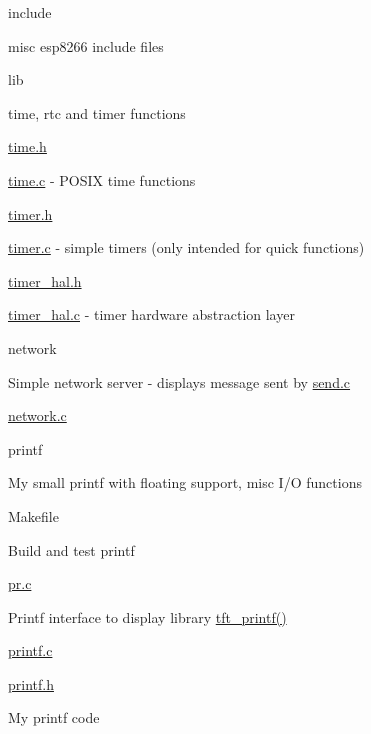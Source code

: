 \begin{DoxyItemize}
\begin{DoxyItemize}
\end{DoxyItemize}
\item include
\begin{DoxyItemize}
\item misc esp8266 include files
\end{DoxyItemize}
\item lib
\begin{DoxyItemize}
\item time, rtc and timer functions
\begin{DoxyItemize}
\item \hyperlink{time_8h}{time.\-h}
\item \hyperlink{time_8c}{time.\-c} -\/ P\-O\-S\-I\-X time functions
\item \hyperlink{timer_8h}{timer.\-h}
\item \hyperlink{timer_8c}{timer.\-c} -\/ simple timers (only intended for quick functions)
\item \hyperlink{timer__hal_8h}{timer\-\_\-hal.\-h}
\item \hyperlink{timer__hal_8c}{timer\-\_\-hal.\-c} -\/ timer hardware abstraction layer
\end{DoxyItemize}
\end{DoxyItemize}
\item network
\begin{DoxyItemize}
\item Simple network server -\/ displays message sent by \hyperlink{send_8c}{send.\-c}
\begin{DoxyItemize}
\item \hyperlink{network_8c}{network.\-c}
\end{DoxyItemize}
\end{DoxyItemize}
\item printf
\begin{DoxyItemize}
\item My small printf with floating support, misc I/\-O functions
\begin{DoxyItemize}
\item Makefile
\begin{DoxyItemize}
\item Build and test printf
\end{DoxyItemize}
\item \hyperlink{pr_8c}{pr.\-c}
\begin{DoxyItemize}
\item Printf interface to display library \hyperlink{pr_8c_ad6d6dda4facdc045d477c0cc9403e0c1}{tft\-\_\-printf()}
\end{DoxyItemize}
\item \hyperlink{printf_8c}{printf.\-c}
\item \hyperlink{printf_8h}{printf.\-h}
\begin{DoxyItemize}
\item My printf code
\end{DoxyItemize}
\end{DoxyItemize}
\end{DoxyItemize}
\end{DoxyItemize}

